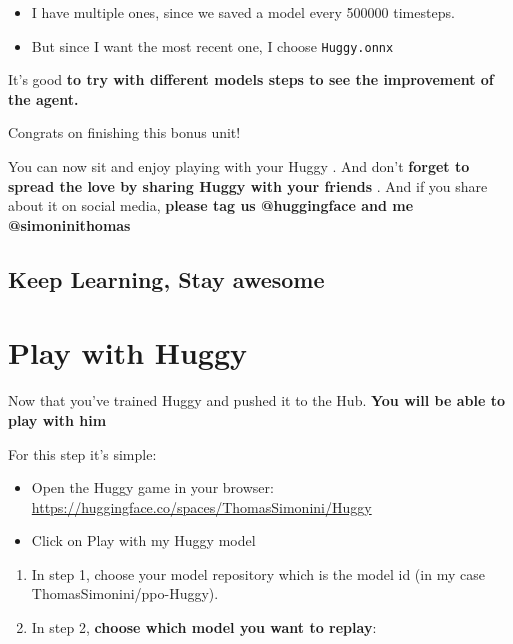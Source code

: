 \documentclass[11pt,a4paper]{article}
\begin{document}
\begin{itemize}
\tightlist
\item
  I have multiple ones, since we saved a model every 500000 timesteps.
\item
  But since I want the most recent one, I choose \texttt{Huggy.onnx}
\end{itemize}

It's good \textbf{to try with different models steps to see the improvement of the agent.}

Congrats on finishing this bonus unit!

You can now sit and enjoy playing with your Huggy . And don't \textbf{forget to spread the love by sharing Huggy with your friends }. And if you share about it on social media, \textbf{please tag us @huggingface and me @simoninithomas}


\subsection{Keep Learning, Stay awesome}\label{keep-learning-stay-awesome}

\section{Play with Huggy}\label{play-with-huggy}

Now that you've trained Huggy and pushed it to the Hub. \textbf{You will be able to play with him }

For this step it's simple:

\begin{itemize}
\tightlist
\item
  Open the Huggy game in your browser: \url{https://huggingface.co/spaces/ThomasSimonini/Huggy}
\item
  Click on Play with my Huggy model
\end{itemize}


\begin{enumerate}
\def\labelenumi{\arabic{enumi}.}
\item
  In step 1, choose your model repository which is the model id (in my case ThomasSimonini/ppo-Huggy).
\item
  In step 2, \textbf{choose which model you want to replay}:
\end{enumerate}
\end{document}
